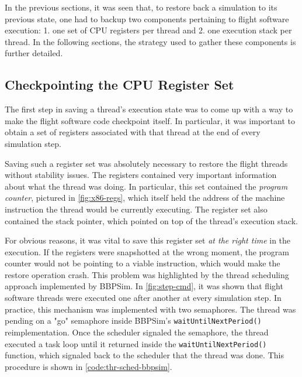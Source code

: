 In the previous sections, it was seen that, to restore back a simulation to its previous state, one had to backup two components pertaining to flight software execution: 1. one set of CPU registers per thread and 2. one execution stack per thread. In the following sections, the strategy used to gather these components is further detailed.

\subsection*{Checkpointing the CPU Register Set}
The first step in saving a thread's execution state was to come up with a way to make the flight software code checkpoint itself. In particular, it was important to obtain a set of registers associated with that thread at the end of every simulation step.

Saving such a register set was absolutely necessary to restore the flight threads without stability issues. The registers contained very important information about what the thread was doing. In particular, this set contained the \textit{program counter}, pictured in \autoref{fig:x86-regs}, which itself held the address of the machine instruction the thread would be currently executing. The register set also contained the stack pointer, which pointed on top of the thread's execution stack.

For obvious reasons, it was vital to save this register set \textit{at the right time} in the execution. If the registers were snapshotted at the wrong moment, the program counter would not be pointing to a viable instruction, which would make the restore operation crash. This problem was highlighted by the thread scheduling approach implemented by BBPSim. In \autoref{fig:step-cmd}, it was shown that flight software threads were executed one after another at every simulation step. In practice, this mechanism was implemented with two semaphores. The thread was pending on a "go" semaphore inside BBPSim's \texttt{waitUntilNextPeriod()} reimplementation. Once the scheduler signaled the semaphore, the thread executed a task loop until it returned inside the \texttt{waitUntilNextPeriod()} function, which signaled back to the scheduler that the thread was done. This procedure is shown in \autoref{code:thr-sched-bbpsim}.

